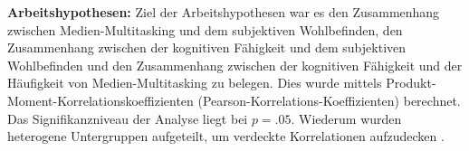 \textbf{Arbeitshypothesen:} Ziel der Arbeitshypothesen war es den Zusammenhang zwischen Medien-Multitasking und dem subjektiven Wohlbefinden, den Zusammenhang zwischen der kognitiven Fähigkeit und dem subjektiven Wohlbefinden und den Zusammenhang zwischen der kognitiven Fähigkeit und der Häufigkeit von Medien-Multitasking zu belegen. Dies wurde mittels Produkt-Moment-Korrelationskoeffizienten (Pearson-Korrelations-Koeffizienten) berechnet. Das Signifikanzniveau der Analyse liegt bei $p=.05$. Wiederum wurden heterogene Untergruppen aufgeteilt, um verdeckte Korrelationen aufzudecken \cite{Ebermann2014}. \par








